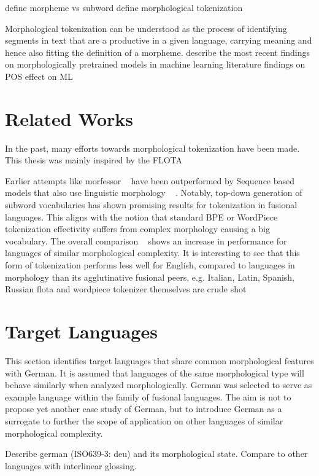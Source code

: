 define morpheme vs subword
define morphological tokenization

Morphological tokenization can be understood as the process of identifying segments in text that are a productive in a given language, carrying meaning and hence also fitting the definition of a morpheme.
describe the most recent findings on morphologically pretrained models in machine learning literature
findings on POS effect on ML

\section{Related Works}
\label{sec:related-works}



In the past, many efforts towards morphological tokenization have been made.
This thesis was mainly inspired by the FLOTA

Earlier attempts like morfessor ~\cite{morfessor} have been outperformed by Sequence based models that also use linguistic morphology ~\cite{subwordvsmorfessor} .
Notably, top-down generation of subword vocabularies has shown promising results for tokenization in fusional languages.
This aligns with the notion that standard BPE or WordPiece tokenization effectivity suffers from complex morphology causing a big vocabulary.
The overall comparison ~\cite[134]{subwordvsmorfessor} shows an increase in performance for languages of similar morphological complexity.
It is interesting to see that this form of tokenization performs less well for English, compared to languages  in morphology than its agglutinative fusional peers, e.g. Italian, Latin, Spanish, Russian
flota and wordpiece tokenizer themselves are crude shot


\section{Target Languages}
\label{sec:target-languages}
This section identifies target languages that share common morphological features with German.
It is assumed that languages of the same morphological type will behave similarly when analyzed morphologically.
German was selected to serve as example language within the family of fusional languages.
The aim is not to propose yet another case study of German, but to introduce German as a surrogate to further the scope of application on other languages of similar morphological complexity.

Describe german (ISO639-3: deu) and its morphological state. Compare to other languages with interlinear glossing.


